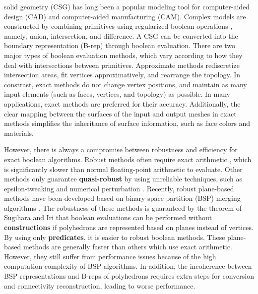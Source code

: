  solid geometry (CSG) has long been a popular modeling tool for computer-aided design (CAD) and computer-aided manufacturing (CAM). Complex models are constructed by combining primitives using regularized boolean operations \cite{requicha1977mathematical,tilove1980closure}, namely, union, intersection, and difference. A CSG can be converted into the boundary representation (B-rep) through boolean evaluation. There are two major types of boolean evaluation methods, which vary according to how they deal with intersections between primitives.
Approximate methods \cite{wang2011approximate,pavic2010hybrid,biermann2001approximate} rediscretize  intersection areas, fit vertices approximatively, and rearrange the topology.
In constrast, exact methods \cite{ogayar2015deferred,douze2015quickcsg,zhou2016mesh} do not change vertex positions, and maintain as many input elements (such as faces, vertices, and topology) as possible. In many applications, exact methods are preferred for their accuracy. Additionally, the clear mapping between the surfaces of the input and output meshes in exact methods simplifies the inheritance of surface information, such as face colors and materials.



However, there is always a compromise between robustness and efficiency for exact boolean algorithms.
Robust methods often require exact arithmetic \cite{barki2015exact,zhou2016mesh}, which is significantly slower than normal floating-point arithmetic to evaluate.
Other methods only guarantee \textbf{quasi-robust}  \cite{shewchuk1999lecture} by using unreliable techniques, such as epsilon-tweaking \cite{laidlaw1986constructive,feito2013fast,segal1990using} and numerical perturbation \cite{douze2015quickcsg}.
Recently, robust plane-based methods have been developed \cite{bernstein2009fast,campen2010exact} based on binary space partition (BSP) merging algorithms \cite{naylor1990merging,thibault1987set}.
The robustness of these methods is guaranteed by the theorem of Sugihara and Iri \cite{sugihara1990solid} that boolean evaluations can be performed without \textbf{constructions} \cite{shewchuk1999lecture} if polyhedrons are represented based on planes instead of vertices.
By using only \textbf{predicates}, it is easier to robust boolean methods.
These plane-based methods are generally faster than others which use exact arithmetic. However, they still suffer from performance issues because of the high computation complexity of BSP algorithms. In addition, the incoherence between BSP representations and B-reps of polyhedrons requires extra steps for conversion and connectivity reconstruction, leading to worse performance.



